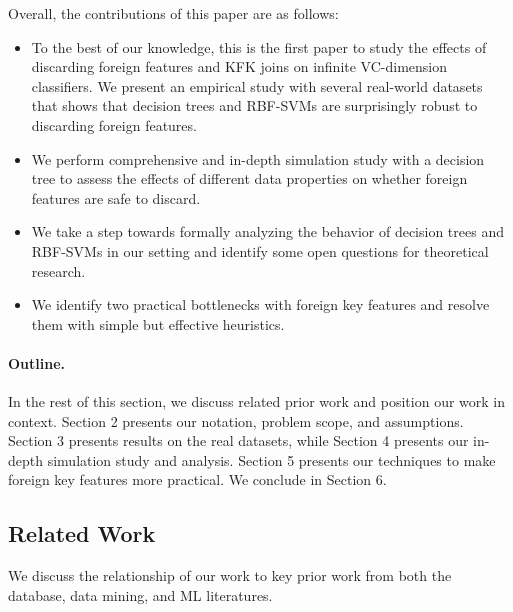 \documentclass[sigconf]{acmart}
\newenvironment{packeditems}{
\begin{itemize}
  \setlength{\itemsep}{1pt}
  \setlength{\parskip}{0pt}
  \setlength{\parsep}{0pt}
}{\end{itemize}}
\begin{document}
\vspace{1mm}
\noindent Overall, the contributions of this paper are as follows:

\begin{packeditems}
\item To the best of our knowledge, this is the first paper to study the effects of discarding foreign features and KFK joins on infinite VC-dimension classifiers.
We present an empirical study with several real-world datasets that shows that decision trees and RBF-SVMs are surprisingly robust to discarding foreign features.

\item We perform comprehensive and in-depth simulation study with a decision tree to assess the effects of different data properties on whether foreign features are safe to discard.

\item We take a step towards formally analyzing the behavior of decision trees and RBF-SVMs in our setting and identify some open questions for theoretical research.

\item We identify two practical bottlenecks with foreign key features and resolve them with simple but effective heuristics.
\end{packeditems}


\paragraph*{Outline.} In the rest of this section, we discuss related prior work and position our work in context. Section 2 presents our notation, problem scope, and assumptions. 
Section 3 presents results on the real datasets, while Section 4 presents our in-depth simulation study and analysis. Section 5 presents our techniques to make foreign key features
more practical. We conclude in Section 6.

\subsection*{Related Work}

We discuss the relationship of our work to key prior work from both the database, data mining, and ML literatures.
\end{document}
